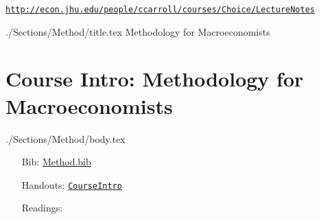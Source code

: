 \documentclass{\econtex}\newcommand{\texname}{Syllabus}
\begin{document}
\texttt{\href{http://econ.jhu.edu/people/ccarroll/courses/Choice/LectureNotes}{http://econ.jhu.edu/people/ccarroll/courses/Choice/LectureNotes}}

\pagebreak


\begin{verbatimwrite}{./Sections/Method/title.tex}
Methodology for Macroeconomists
\end{verbatimwrite}
\section{Course Intro: Methodology for Macroeconomists}

\begin{verbatimwrite}{./Sections/Method/body.tex}

\begin{itemize}
\item[Bib:] \href{http://www.econ2.jhu.edu/people/ccarroll/courses/choice/Syllabus/Method.bib}{Method.bib}
\item[Handouts:]  \texttt{\href{http://www.econ2.jhu.edu/people/ccarroll/courses/choice/lecturenotes/CourseIntro}{CourseIntro}}
\item[Readings:]
\end{itemize}


\begin{itemize} 
\reqd \cite{summersIllusion}  
\reqd \cite{acemogluCrisis}   
\reqd \cite{krugmanHistory}   
\reqd \cite{caballeroPretense}
\reqd \cite{barberaFight}     
\reqd \cite{romerTrouble}
\end{itemize}

\end{verbatimwrite}



\ifPost
{} 
\fi
\end{document}
